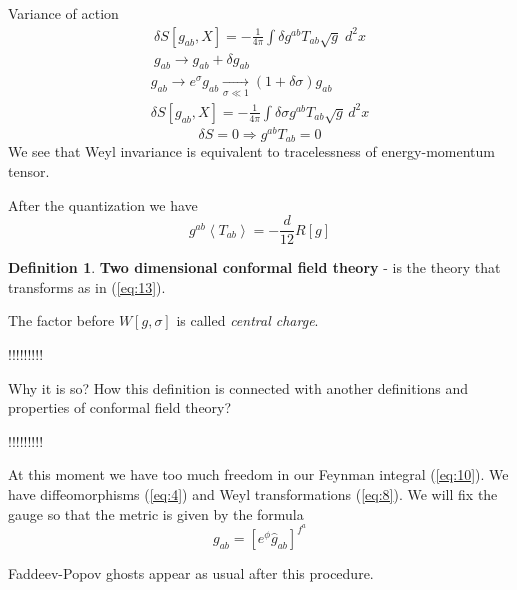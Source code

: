 \documentclass[a4paper,12pt]{article}
\theoremstyle{definition} \newtheorem{Def}{Definition}
\begin{document}
Variance of action
\begin{equation}
  \label{eq:14}
  \begin{split}
    \delta S[g_{ab},X] = -\frac{1}{4\pi} \int  \delta g^{ab} T_{ab} \sqrt{g} \; d^2x\\
    g_{ab}\to g_{ab}+\delta g_{ab}
  \end{split}
\end{equation}
\begin{equation}
  \label{eq:15}
  \begin{split}
    g_{ab} \to e^{\sigma} g_{ab} \xrightarrow[\sigma \ll 1]{} (1+\delta\sigma) g_{ab}\\
    \delta S [g_{ab},X] = -\frac{1}{4\pi} \int \delta\sigma g^{ab} T_{ab} \sqrt{g}\, d^2 x
  \end{split}
\end{equation}
\begin{equation}
  \label{eq:16}
    \delta S =0 \Rightarrow g^{ab}T_{ab}=0
\end{equation}
We see that Weyl invariance is equivalent to tracelessness of energy-momentum tensor.

After the quantization we have
\begin{equation}
  \label{eq:17}
  g^{ab}\left< T_{ab} \right> = -\frac{d}{12} R[g]
\end{equation}
\begin{Def}
  {\bf Two dimensional conformal field theory} - is the theory that transforms as in (\ref{eq:13}).

  The factor before $W[g,\sigma]$ is called {\it central charge}.
\end{Def}

!!!!!!!!!

Why it is so? How this definition is connected with another definitions and properties of conformal field theory?

!!!!!!!!!


At this moment we have too much freedom in our Feynman integral (\ref{eq:10}). We have diffeomorphisms (\ref{eq:4}) and Weyl transformations (\ref{eq:8}). We will fix the gauge so that the metric is given by the formula 
\begin{equation}
  \label{eq:20}
  g_{ab}=[e^{\phi} \hat{g}_{ab}]^{f^a}
\end{equation}

Faddeev-Popov ghosts appear as usual after this procedure.
\end{document}
